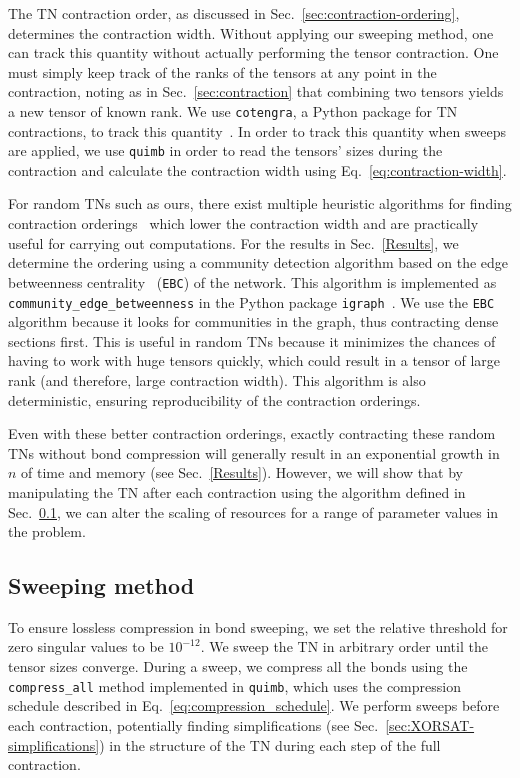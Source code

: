 The TN contraction order, as discussed in Sec.~\ref{sec:contraction-ordering}, determines the contraction width.
Without applying our sweeping method, one can track this quantity without actually performing the tensor contraction.
One must simply keep track of the ranks of the tensors at any point in the contraction, noting as in Sec.~\ref{sec:contraction} that combining two tensors yields a new tensor of known rank.
We use \verb|cotengra|, a Python package for TN contractions, to track this quantity~\cite{gray_hyper-optimized_2021}.
In order to track this quantity when sweeps are applied, we use \verb|quimb| in order to read the tensors' sizes during the contraction and calculate the contraction width using Eq.~\ref{eq:contraction-width}.

For random TNs such as ours, there exist multiple heuristic algorithms for finding contraction orderings~\cite{gray_hyper-optimized_2021, gray_hyper-optimized_2022} which lower the contraction width and are practically useful for carrying out computations.
For the results in Sec.~\ref{Results}, we determine the ordering using a community detection algorithm based on the edge betweenness centrality~\cite{girvan_community_2002} (\verb|EBC|) of the network.
This algorithm is implemented as \verb|community_edge_betweenness| in the Python package \verb|igraph|~\cite{csardi_igraph_nodate}.
We use the \verb|EBC| algorithm because it looks for communities in the graph, thus contracting dense sections first.
This is useful in random TNs because it minimizes the chances of having to work with huge tensors quickly, which could result in a tensor of large rank (and therefore, large contraction width).
This algorithm is also deterministic, ensuring reproducibility of the contraction orderings.

Even with these better contraction orderings, exactly contracting these random TNs without bond compression will generally result in an exponential growth in $n$ of time and memory (see Sec.~\ref{Results}).
However, we will show that by manipulating the TN after each contraction using the algorithm defined in Sec.~\ref{sec:sweeping-method}, we can alter the scaling of resources for a range of parameter values in the problem.


\subsection{Sweeping method} \label{sec:sweeping-method}
To ensure lossless compression in bond sweeping, we set the relative threshold for zero singular values to be $10^{-12}$.
We sweep the TN in arbitrary order until the tensor sizes converge.
During a sweep, we compress all the bonds using the \verb|compress_all| method implemented in \verb|quimb|, which uses the compression schedule described in Eq.~\ref{eq:compression_schedule}.
We perform sweeps before each contraction, potentially finding simplifications (see Sec.~\ref{sec:XORSAT-simplifications}) in the structure of the TN during each step of the full contraction.
